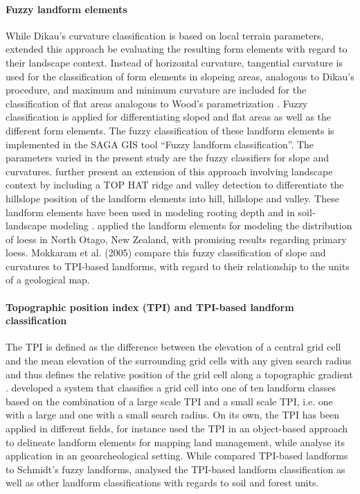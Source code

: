 \documentclass[final,1p,times,twocolumn,authoryear]{elsarticle}
\begin{document}
\paragraph{Fuzzy landform elements \citep{Schmidt2004}}
While Dikau's curvature classification is based on local terrain parameters, \cite{Schmidt2004} extended this approach be evaluating the resulting form elements with regard to their landscape context.  Instead of horizontal curvature, tangential curvature is used for the classification of form elements in slopeing areas, analogous to Dikau's procedure, and maximum and minimum curvature are included for the classification of flat areas analogous to Wood's parametrization \citep{Wood1996}. Fuzzy classification is applied for differentiating sloped and flat areas as well as the different form elements. The fuzzy classification of these landform elements is implemented in the SAGA GIS tool “Fuzzy landform classification”. The parameters varied in the present study are the fuzzy classifiers for slope and curvatures. \cite{Schmidt2004} further present an extension of this approach involving landscape context by including a TOP HAT ridge and valley detection \citep{Rodriguez2002}  to differentiate the hillslope position of the landform elements into hill, hillslope and valley. These landform elements have been used in modeling rooting depth \citep{Schmidt2004} and in  soil-landscape modeling \citep{Schmidt2005}. \cite{Hughes2009} applied  the landform elements for modeling the distribution of loess in North Otago, New Zealand, with promising results regarding primary loess. Mokkaram et al. (2005) compare this fuzzy classification of slope and curvatures to TPI-based landforms, with regard to their relationship to the units of a geological map.
\paragraph{Topographic position index (TPI) and TPI-based landform classification \citep{Weiss2000}}
The TPI is defined as the difference between the elevation of a central grid cell and the mean elevation of the surrounding grid cells with any given search radius and thus defines the relative position of the grid cell along a topographic gradient \citep{Guisan1999}. \cite{Weiss2000} developed a system that classifies a grid cell into one of ten landform classes based on the combination of a large scale TPI and a small scale TPI, i.e. one with a large and one with a small search radius.  On its own, the TPI has been applied in different fields, for instance \cite{Gercek2010} used the TPI in an object-based approach to delineate landform elements for mapping land management, while \cite{Reu2013} analyse its application in an geoarcheological setting. While \cite{Mokarram2015} compared TPI-based landforms to Schmidt's fuzzy landforms, \cite{Barka2011} analysed the TPI-based landform classification as well as other landform classifications with regards to  soil and forest units.
\end{document}
